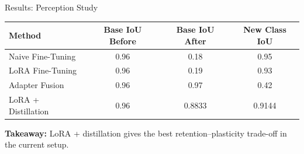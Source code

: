 \documentclass[12pt,aspectratio=169]{beamer}
\begin{document}
\begin{frame}{Results: Perception Study}
    \footnotesize
    \centering
    \renewcommand{\arraystretch}{1.15}
    \setlength{\tabcolsep}{4pt}

    \begin{table}[h]
        \centering
        \begin{tabularx}{0.96\textwidth}{@{}L{4.0cm} c c c@{}}
        \toprule
        \textbf{Method} & \textbf{Base IoU Before} & \textbf{Base IoU After} & \textbf{New Class IoU} \\
        \midrule
        Naive Fine-Tuning & 0.96 & 0.18 & 0.95 \\
        LoRA Fine-Tuning & 0.96 & 0.19 & 0.93 \\
        Adapter Fusion & 0.96 & 0.97 & 0.42 \\
        LoRA + Distillation & 0.96 & 0.8833 & 0.9144 \\
        \bottomrule
        \end{tabularx}
    \end{table}

    \vspace{0.15cm}
    \textbf{Takeaway:} LoRA + distillation gives the best retention--plasticity trade-off in the current setup.
\end{frame}
\end{document}

